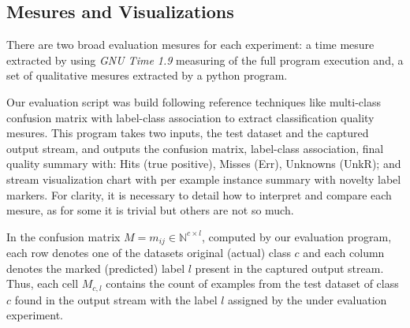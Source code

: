 




\subsection{Mesures and Visualizations}

There are two broad evaluation mesures for each experiment: a time mesure
extracted by using \emph{GNU Time 1.9} measuring of the full program execution
and, a set of qualitative mesures extracted by a python program.

Our evaluation script was build following reference techniques like multi-class
confusion matrix with label-class association \cite{Faria2015minas} to extract
classification quality mesures.
This program takes two inputs, the test dataset and the captured output stream,
and outputs the confusion matrix, label-class association,
final quality summary with:
Hits (true positive), Misses (Err), Unknowns (UnkR); and
stream visualization chart with per example instance summary with novelty label markers.
% 
For clarity, it is necessary to detail how to interpret and compare each mesure,
as for some it is trivial but others are not so much.

In the confusion matrix $M = m_{ij} \in \mathbb{N} ^{c \times{} l}$, computed by
our evaluation program, each row denotes one of the datasets original (actual)
class $c$ and each column denotes the marked (predicted) label $l$ present in
the captured output stream.
Thus, each cell $M_{c, l}$ contains the count of examples from the test dataset
of class $c$ found in the output stream with the label $l$ assigned by the under
evaluation experiment.

